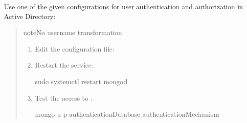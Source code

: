 \documentclass[letterpaper,10pt,english]{sphinxmanual}
\begin{document}
\sphinxAtStartPar
Use one of the given  configurations for user authentication and authorization in Active Directory:
\begin{quote}

\begin{sphinxadmonition}{note}{No username transformation}
\begin{enumerate}
%
\item {} 
\sphinxAtStartPar
Edit the  configuration file:

\begin{sphinxVerbatim}[commandchars=\\\{\}]

\end{sphinxVerbatim}

\item {} 
\sphinxAtStartPar
Restart the  service:

\begin{sphinxVerbatim}[commandchars=\\\{\}]
\PYGZdl{} sudo systemctl restart mongod
\end{sphinxVerbatim}

\item {} 
\sphinxAtStartPar
Test the access to :

\begin{sphinxVerbatim}[commandchars=\\\{\}]
mongo \PYGZhy{}u  \PYGZhy{}p  \PYGZhy{}\PYGZhy{}authenticationDatabase  \PYGZhy{}\PYGZhy{}authenticationMechanism 
\end{sphinxVerbatim}


\end{enumerate}
\end{sphinxadmonition}
\end{quote}
\end{document}
